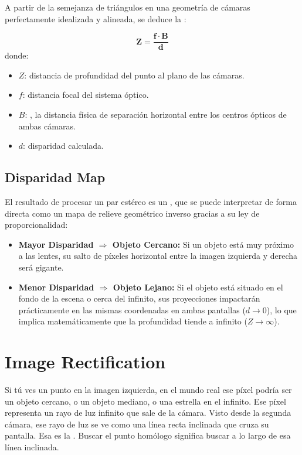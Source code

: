\noindent
A partir de la semejanza de triángulos en una geometría de cámaras perfectamente idealizada y alineada, se deduce la :

$$\mathbf{Z = \frac{f \cdot B}{d}}$$
donde:
\begin{itemize}
    \item $Z$: distancia de profundidad del punto al plano de las cámaras.
    \item $f$: distancia focal del sistema óptico.
    \item $B$: , la distancia física de separación horizontal entre los centros ópticos de ambas cámaras.
    \item $d$: disparidad calculada.
\end{itemize}

\subsection{Disparidad Map}
\noindent
El resultado de procesar un par estéreo es un , que se puede interpretar de forma directa como un mapa de relieve geométrico inverso gracias a su ley de proporcionalidad:

\begin{itemize}
    \item \textbf{Mayor Disparidad $\Longrightarrow$ Objeto Cercano:} Si un objeto está muy próximo a las lentes, su salto de píxeles horizontal entre la imagen izquierda y derecha será gigante.
    \item \textbf{Menor Disparidad $\Longrightarrow$ Objeto Lejano:} Si el objeto está situado en el fondo de la escena o cerca del infinito, sus proyecciones impactarán prácticamente en las mismas coordenadas en ambas pantallas ($d \to 0$), lo que implica matemáticamente que la profundidad tiende a infinito ($Z \to \infty$).
\end{itemize}


\section{Image Rectification}
\begin{definicion}
    Si tú ves un punto en la imagen izquierda, en el mundo real ese píxel podría ser un objeto cercano, o un objeto mediano, o una estrella en el infinito. Ese píxel representa un rayo de luz infinito que sale de la cámara. Visto desde la segunda cámara, ese rayo de luz se ve como una línea recta inclinada que cruza su pantalla. Esa es la . Buscar el punto homólogo significa buscar a lo largo de esa línea inclinada. \\
\end{definicion}


